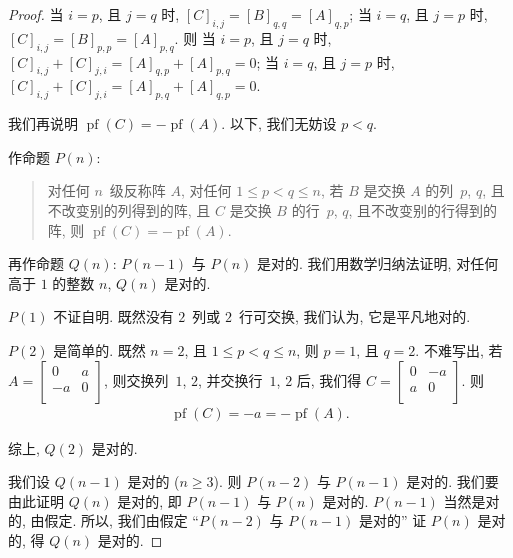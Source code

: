 \documentclass[../libro.tex]{subfiles}
\begin{document}
\begin{proof}
    当 \(i = p\), 且 \(j = q\) 时,
    \([C]_{i,j} = [B]_{q,q} = [A]_{q,p}\);
    当 \(i = q\), 且 \(j = p\) 时,
    \([C]_{i,j} = [B]_{p,p} = [A]_{p,q}\).
    则%
    当 \(i = p\), 且 \(j = q\) 时,
    \([C]_{i,j} + [C]_{j,i}
    = [A]_{q,p} + [A]_{p,q} = 0\);
    当 \(i = q\), 且 \(j = p\) 时,
    \([C]_{i,j} + [C]_{j,i}
    = [A]_{p,q} + [A]_{q,p} = 0\).

    我们再说明
    \(
        \operatorname{pf} {(C)} = -\operatorname{pf} {(A)}
    \).
    以下, 我们无妨设 \(p < q\).

    作命题 \(P(n)\):
    \begin{quotation}
        对任何 \(n\)~级反称阵 \(A\),
        对任何 \(1 \leq p < q \leq n\),
        若 \(B\) 是交换 \(A\) 的列~\(p\), \(q\),
        且不改变别的列得到的阵,
        且 \(C\) 是交换 \(B\) 的行~\(p\), \(q\),
        且不改变别的行得到的阵,
        则
        \(
            \operatorname{pf} {(C)} = -\operatorname{pf} {(A)}
        \).
    \end{quotation}
    再作命题 \(Q(n)\):
    \(P(n-1)\) 与 \(P(n)\) 是对的.
    我们用数学归纳法证明,
    对任何高于 \(1\) 的整数 \(n\), \(Q(n)\) 是对的.

    \(P(1)\) 不证自明.
    既然没有 \(2\)~列或 \(2\)~行可交换,
    我们认为, 它是平凡地对的.

    \(P(2)\) 是简单的.
    既然 \(n = 2\), 且 \(1 \leq p < q \leq n\),
    则 \(p = 1\), 且 \(q = 2\).
    不难写出, 若 \(A =
        \begin{bmatrix}
            0  & a \\
            -a & 0 \\
        \end{bmatrix}
    \),
    则交换列~\(1\), \(2\),
    并交换行~\(1\), \(2\) 后,
    我们得 \(C =
        \begin{bmatrix}
            0 & -a \\
            a & 0  \\
        \end{bmatrix}
    \).
    则
    \begin{align*}
        \operatorname{pf} {(C)}
        = -a
        = -\operatorname{pf} {(A)}.
    \end{align*}

    综上, \(Q(2)\) 是对的.

    我们设 \(Q(n-1)\) 是对的 (\(n \geq 3\)).
    则 \(P(n-2)\) 与 \(P(n-1)\) 是对的.
    我们要由此证明 \(Q(n)\) 是对的,
    即 \(P(n-1)\) 与 \(P(n)\) 是对的.
    \(P(n-1)\) 当然是对的, 由假定.
    所以, 我们由假定
    ``\(P(n-2)\) 与 \(P(n-1)\) 是对的''
    证 \(P(n)\) 是对的,
    得 \(Q(n)\) 是对的.


\end{proof}
\end{document}
